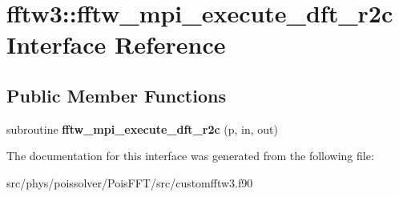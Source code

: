 \hypertarget{interfacefftw3_1_1fftw__mpi__execute__dft__r2c}{}\section{fftw3\+:\+:fftw\+\_\+mpi\+\_\+execute\+\_\+dft\+\_\+r2c Interface Reference}
\label{interfacefftw3_1_1fftw__mpi__execute__dft__r2c}
\subsection*{Public Member Functions}
\begin{DoxyCompactItemize}
\item 
subroutine {\bfseries fftw\+\_\+mpi\+\_\+execute\+\_\+dft\+\_\+r2c} (p, in, out)\hypertarget{interfacefftw3_1_1fftw__mpi__execute__dft__r2c_acfc2da37a9fad8b3a83548a6aa6fac9f}{}\label{interfacefftw3_1_1fftw__mpi__execute__dft__r2c_acfc2da37a9fad8b3a83548a6aa6fac9f}

\end{DoxyCompactItemize}


The documentation for this interface was generated from the following file\+:\begin{DoxyCompactItemize}
\item 
src/phys/poissolver/\+Pois\+F\+F\+T/src/customfftw3.\+f90\end{DoxyCompactItemize}
